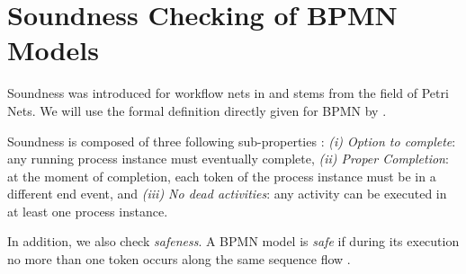 \documentclass[runningheads]{llncs}
\begin{document}

\cite{corradiniClassificationBPMNCollaborations2018}


\section{Soundness Checking of BPMN Models}

Soundness was introduced for workflow nets in \cite{vanderaalstAPPLICATIONPETRINETS1998} and stems from the field of Petri Nets.
We will use the formal definition directly given for BPMN by \cite{corradiniClassificationBPMNCollaborations2018}.

Soundness is composed of three following sub-properties \cite{corradiniClassificationBPMNCollaborations2018}:
\textit{(i) Option to complete}: any running process instance must eventually complete,
\textit{(ii) Proper Completion}: at the moment of completion, each token of the process instance must be in a different end event, and
\textit{(iii) No dead activities}: any activity can be executed in at least one process instance.

In addition, we also check \textit{safeness}.
A BPMN model is \textit{safe} if during its execution no more than one token occurs along the same sequence flow \cite{corradiniClassificationBPMNCollaborations2018}.
\end{document}
